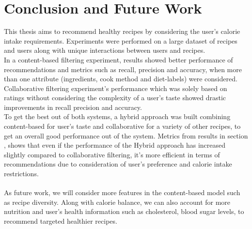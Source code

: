 \chapter{Conclusion and Future Work}
\label{ch:conclusion}
This thesis aims to recommend healthy recipes by considering the user's calorie intake requirements. Experiments were performed on a large dataset of recipes and users along with unique interactions between users and recipes. \\
In a content-based filtering experiment, results showed better performance of recommendations and metrics such as recall, precision and accuracy, when more than one attribute (ingredients, cook method and diet-labels) were considered. \\
Collaborative filtering experiment's performance which was solely based on ratings without considering the complexity of a user's taste showed drastic improvements in recall precision and accuracy.\\
To get the best out of both systems, a hybrid approach was built combining content-based for user's taste and collaborative for a variety of other recipes, to get an overall good performance out of the system.
Metrics from results in section , shows that even if the performance of the Hybrid approach has increased slightly compared to collaborative filtering, it's more efficient in terms of recommendations due to consideration of user's preference and calorie intake restrictions. \\
\\
As future work, we will consider more features in the content-based model such as recipe diversity.
Along with calorie balance, we can also account for more nutrition and user's health information such as cholesterol, blood sugar levels, to recommend targeted healthier recipes.